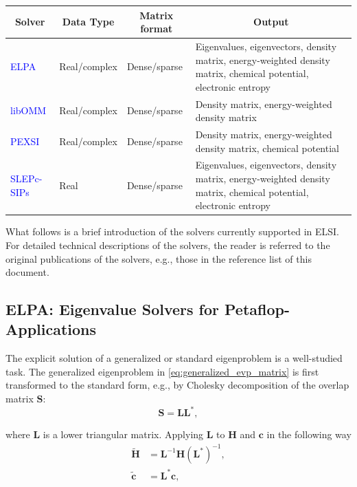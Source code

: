 \documentclass{report}
\begin{document}
\begin{tabular}[]{|p{20mm}|p{25mm}|p{25mm}|p{95mm}|}
\hline
\multicolumn{1}{|c|}{\textbf{Solver}} & \multicolumn{1}{c|}{\textbf{Data Type}} & \multicolumn{1}{c|}{\textbf{Matrix format}} & \multicolumn{1}{c|}{\textbf{Output}}\\
\hline
\textcolor{blue}{ELPA}       & Real/complex & Dense/sparse & Eigenvalues, eigenvectors, density matrix, energy-weighted density matrix, chemical potential, electronic entropy\\
\hline
\textcolor{blue}{libOMM}     & Real/complex & Dense/sparse & Density matrix, energy-weighted density matrix\\
\hline
\textcolor{blue}{PEXSI}      & Real/complex & Dense/sparse & Density matrix, energy-weighted density matrix, chemical potential\\
\hline
\textcolor{blue}{SLEPc-SIPs} & Real         & Dense/sparse & Eigenvalues, eigenvectors, density matrix, energy-weighted density matrix, chemical potential, electronic entropy\\
\hline
\end{tabular}

\bigskip
What follows is a brief introduction of the solvers currently supported in ELSI.  For detailed technical descriptions of the solvers, the reader is referred to the original publications of the solvers, e.g., those in the reference list of this document.\\

\subsection{ELPA:  Eigenvalue Solvers for Petaflop-Applications}
\label{subsec:solvers_elpa}
The explicit solution of a generalized or standard eigenproblem is a well-studied task.  The generalized eigenproblem in \ref{eq:generalized_evp_matrix} is first transformed to the standard form, e.g., by Cholesky decomposition of the overlap matrix $\boldsymbol{S}$:\\
\begin{equation}
\label{eq:cholesky}
\boldsymbol{S} = \boldsymbol{L} \boldsymbol{L}^* ,
\end{equation}

\noindent where $\boldsymbol{L}$ is a lower triangular matrix.  Applying $\boldsymbol{L}$ to $\boldsymbol{H}$ and $\boldsymbol{c}$ in the following way\\
\begin{equation}
\label{eq:to_standard}
\begin{split}
\boldsymbol{\tilde{H}} & = \boldsymbol{L}^{-1} \boldsymbol{H} (\boldsymbol{L}^*)^{-1} ,\\
\boldsymbol{\tilde{c}} & = \boldsymbol{L}^* \boldsymbol{c} ,
\end{split}
\end{equation}
\end{document}
